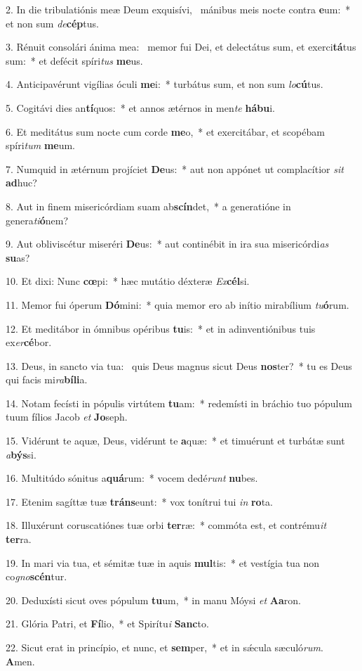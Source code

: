 2. In die tribulatiónis meæ Deum exquisívi, \dag\  mánibus meis nocte contra \textbf{e}um:~*  et non sum \textit{de}\textbf{cép}tus.\

3. Rénuit consolári ánima mea: \dag\  memor fui Dei, et delectátus sum, et exerci\textbf{tá}tus sum:~*  et defécit spíri\textit{tus} \textbf{me}us.\

4. Anticipavérunt vigílias óculi \textbf{me}i:~*  turbátus sum, et non sum \textit{lo}\textbf{cú}tus.\

5. Cogitávi dies an\textbf{tí}quos:~*  et annos ætérnos in men\textit{te} \textbf{há}\textbf{bu}i.\

6. Et meditátus sum nocte cum corde \textbf{me}o,~*  et exercitábar, et scopébam spíri\textit{tum} \textbf{me}um.\

7. Numquid in ætérnum projíciet \textbf{De}us:~*  aut non appónet ut complacítior \textit{sit} \textbf{ad}huc?\

8. Aut in finem misericórdiam suam ab\textbf{scín}det,~*  a generatióne in genera\textit{ti}\textbf{ó}nem?\

9. Aut obliviscétur miseréri \textbf{De}us:~*  aut continébit in ira sua misericórdi\textit{as} \textbf{su}as?\

10. Et dixi: Nunc \textbf{cœ}pi:~*  hæc mutátio déxteræ \textit{Ex}\textbf{cél}si.\

11. Memor fui óperum \textbf{Dó}mini:~*  quia memor ero ab inítio mirabílium \textit{tu}\textbf{ó}rum.\

12. Et meditábor in ómnibus opéribus \textbf{tu}is:~*  et in adinventiónibus tuis ex\textit{er}\textbf{cé}bor.\

13. Deus, in sancto via tua: \dag\  quis Deus magnus sicut Deus \textbf{nos}ter?~*  tu es Deus qui facis mi\textit{ra}\textbf{bí}\textbf{li}a.\

14. Notam fecísti in pópulis virtútem \textbf{tu}am:~*  redemísti in bráchio tuo pópulum tuum fílios Jacob \textit{et} \textbf{Jo}seph.\

15. Vidérunt te aquæ, Deus, vidérunt te \textbf{a}quæ:~*  et timuérunt et turbátæ sunt \textit{a}\textbf{býs}si.\

16. Multitúdo sónitus a\textbf{quá}rum:~*  vocem dedé\textit{runt} \textbf{nu}bes.\

17. Etenim sagíttæ tuæ \textbf{tráns}eunt:~*  vox tonítrui tui \textit{in} \textbf{ro}ta.\

18. Illuxérunt coruscatiónes tuæ orbi \textbf{ter}ræ:~*  commóta est, et contrému\textit{it} \textbf{ter}ra.\

19. In mari via tua, et sémitæ tuæ in aquis \textbf{mul}tis:~*  et vestígia tua non co\textit{gno}\textbf{scén}tur.\

20. Deduxísti sicut oves pópulum \textbf{tu}um,~*  in manu Móysi \textit{et} \textbf{A}\textbf{a}ron.\

21. Glória Patri, et \textbf{Fí}lio,~*  et Spirítu\textit{i} \textbf{Sanc}to.\

22. Sicut erat in princípio, et nunc, et \textbf{sem}per,~*  et in sǽcula sæculó\textit{rum}. \textbf{A}men.\

